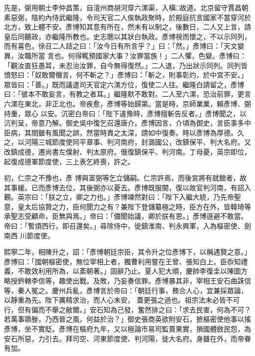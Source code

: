 \begin{pinyinscope}
 先是，弼用朝士李仲昌策，自澶州商胡河穿六漯渠，入橫□故道。北京留守賈昌朝素惡弼，陰約內侍武繼隆，令司天官二人俟執政聚時，於殿庭抗言國家不當穿河於北方，致上體不安。彥博知其意有所在，然未有以制之，後數日，二人又上言，請皇后同聽政，亦繼隆所教也。史志聰以其狀白執政。彥博視而懷之，不以示同列，而有喜色，徐召二人詰之曰：「汝今日有所言乎？」曰：「然。」彥博曰：「天文變異，汝職所當
 言也。何得輒預國家大事？汝罪當族！」二人懼，色變。彥博曰：「觀汝直狂愚耳，未忍治汝罪，自今無得復然。」二人退，乃出狀示同列。同列皆憤怒曰：「奴敢爾僭言，何不斬之？」彥博曰：「斬之，則事彰灼，於中宮不安。」眾皆曰：「善。」既而議遣司天官定六漯方位，復使二人往。繼隆白請留之，彥博曰：「彼本不敢妄言，有教之者耳。」繼隆默不敢對。二人至六漯，恐治前罪，更言六漯在東北，非正北也。帝疾愈，彥博等始歸第。當是時，京師業業，賴彥博、弼持重，眾心
 以安。沆密白帝曰：「陛下違豫時，彥博擅斬告反者。」彥博聞之，以沆判呈，帝意乃解。御史吳中復乞召還唐介。彥博因言，介頃為御史，言臣事多中臣病，其間雖有風聞之誤，然當時責之太深，請如中復奏。時以彥博為厚德。久之，以河陽三城節度使同平章事、判河南府，封潞國公，改鎮保平、判大名府。又改鎮成德，遷尚書左僕射、判太原府。俄復鎮保平、判河南。丁母憂，英宗即位，起復成德軍節度使，三上表乞終喪，許之。



 初，仁宗之不豫也，彥
 博與富弼等乞立儲嗣。仁宗許焉，而後宮將有就館者，故其事緩。已而彥博去位，其後弼亦以憂去。彥博既服闋，復以故官判河南，有詔入覲。英宗曰：「朕之立，卿之力也。」彥博竦然對曰：「陛下入繼大統，乃先帝聖意，皇太后協贊之力，臣何聞力之有？兼陛下登儲纂極之時，臣方在外，皆韓琦等承聖志受顧命，臣無與焉。」帝曰：「備聞始議，卿於朕有恩。」彥博遜避不敢當。帝曰：「暫煩西行，即召還矣。」尋除侍中，徙鎮淮南、判永興軍，入為樞密使、劍南西
 川節度使。



 熙寧二年，相陳升之，詔：「彥博朝廷宗臣，其令升之位彥博下，以稱遇賢之意。」彥博曰：「國朝樞密使，無位宰相上者，獨曹利用嘗在王曾、張知白上。臣忝知禮義，不敢效利用所為，以紊朝著。」固辭乃止。夏人犯大順，慶帥李復圭以陳圖方略授鈐轄李信等，趣使出戰。及敗，乃妄奏信罪。彥博暴其非，宰相王安石曲誅信等，秦人冤之。慶州兵亂，彥博言於帝曰：「朝廷行事，務合人心，宜兼採眾論，以靜重為先。陛下厲精求治，而人心未安，
 蓋更張之過也。祖宗法未必皆不可行，但有偏而不舉之敝爾。」安石知為己發，奮然排之曰：「求去民害，何為不可？若萬事隳脞，乃西晉之風，何益於治？」御史張商英欲附安石，摭樞密使他事以搖彥博，坐不實貶。彥博在樞府九年，又以極論市易司監賣果實，損國體斂民怨，為安石所惡，力引去。拜司空、河東節度使、判河陽，徙大名府。身雖在外，而帝眷有加。




\end{pinyinscope}
